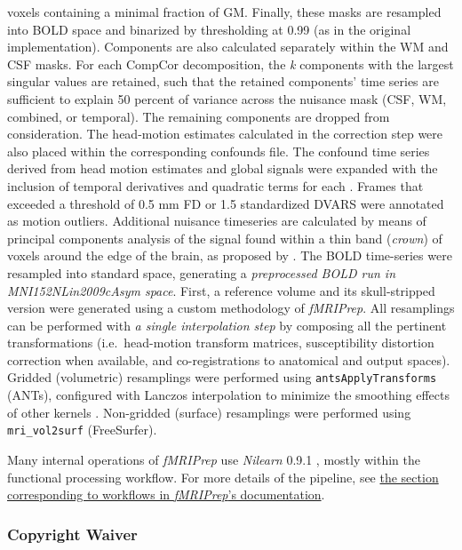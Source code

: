 \documentclass[
]{article}
\begin{document}
\begin{description}
voxels containing a minimal fraction of GM. Finally, these masks are
resampled into BOLD space and binarized by thresholding at 0.99 (as in
the original implementation). Components are also calculated separately
within the WM and CSF masks. For each CompCor decomposition, the
\emph{k} components with the largest singular values are retained, such
that the retained components' time series are sufficient to explain 50
percent of variance across the nuisance mask (CSF, WM, combined, or
temporal). The remaining components are dropped from consideration. The
head-motion estimates calculated in the correction step were also placed
within the corresponding confounds file. The confound time series
derived from head motion estimates and global signals were expanded with
the inclusion of temporal derivatives and quadratic terms for each
\citep{confounds_satterthwaite_2013}. Frames that exceeded a threshold
of 0.5 mm FD or 1.5 standardized DVARS were annotated as motion
outliers. Additional nuisance timeseries are calculated by means of
principal components analysis of the signal found within a thin band
(\emph{crown}) of voxels around the edge of the brain, as proposed by
\citep{patriat_improved_2017}. The BOLD time-series were resampled into
standard space, generating a \emph{preprocessed BOLD run in
MNI152NLin2009cAsym space}. First, a reference volume and its
skull-stripped version were generated using a custom methodology of
\emph{fMRIPrep}. All resamplings can be performed with \emph{a single
interpolation step} by composing all the pertinent transformations
(i.e.~head-motion transform matrices, susceptibility distortion
correction when available, and co-registrations to anatomical and output
spaces). Gridded (volumetric) resamplings were performed using
\texttt{antsApplyTransforms} (ANTs), configured with Lanczos
interpolation to minimize the smoothing effects of other kernels
\citep{lanczos}. Non-gridded (surface) resamplings were performed using
\texttt{mri\_vol2surf} (FreeSurfer).
\end{description}

Many internal operations of \emph{fMRIPrep} use \emph{Nilearn} 0.9.1
\citep[RRID:SCR\_001362]{nilearn}, mostly within the functional
processing workflow. For more details of the pipeline, see
\href{https://fmriprep.readthedocs.io/en/latest/workflows.html}{the
section corresponding to workflows in \emph{fMRIPrep}'s documentation}.

\hypertarget{copyright-waiver}{%
\subsubsection{Copyright Waiver}\label{copyright-waiver}}
\end{document}
